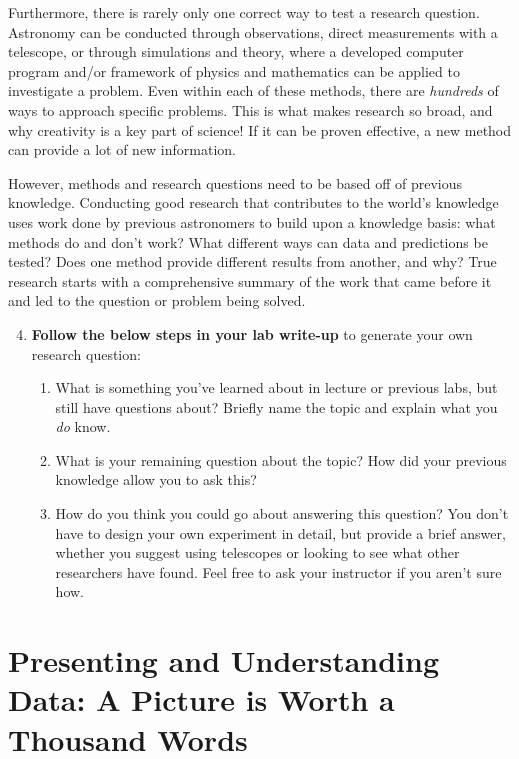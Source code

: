 \documentclass[11pt]{article}%
\begin{document}
Furthermore, there is rarely only one correct way to test a research question. Astronomy can be conducted through observations, direct measurements with a telescope, or through simulations and theory, where a developed computer program and/or framework of physics and mathematics can be applied to investigate a problem. Even within each of these methods, there are \textit{hundreds} of ways to approach specific problems. This is what makes research so broad, and why creativity is a key part of science! If it can be proven effective, a new method can provide a lot of new information. 

However, methods and research questions need to be based off of previous knowledge. Conducting good research that contributes to the world's knowledge uses work done by previous astronomers to build upon a knowledge basis: what methods do and don't work? What different ways can data and predictions be tested? Does one method provide different results from another, and why? True research starts with a comprehensive summary of the work that came before it and led to the question or problem being solved. 

\begin{enumerate}
\setcounter{enumi}{3}

\item \textbf{Follow the below steps in your lab write-up} to generate your own research question:
\begin{enumerate}
    \item What is something you've learned about in lecture or previous labs, but still have questions about? Briefly name the topic and explain what you \textit{do} know.
    \item What is your remaining question about the topic? How did your previous knowledge allow you to ask this?
    \item How do you think you could go about answering this question? You don't have to design your own experiment in detail, but provide a brief answer, whether you suggest using telescopes or looking to see what other researchers have found. Feel free to ask your instructor if you aren't sure how.
\end{enumerate}

\end{enumerate}

\newpage

\section{Presenting and Understanding Data: A Picture is Worth a Thousand Words}
\end{document}
